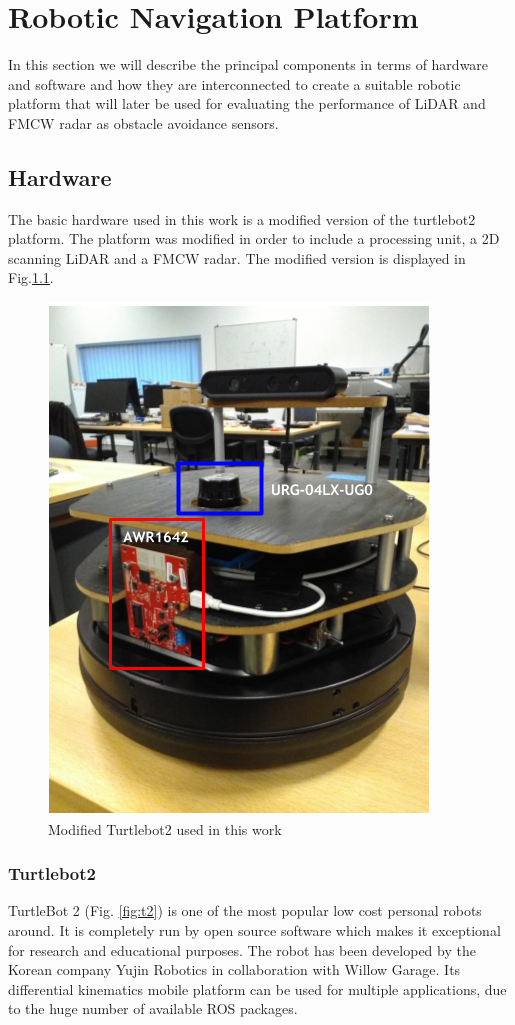 \chapter{Robotic Navigation Platform }

In this section we will describe the principal components in terms of hardware and software and how they are interconnected to create a suitable robotic platform that will later be used for evaluating the performance of \ac{LiDAR} and \ac{FMCW} \ac{radar} as obstacle avoidance sensors.


\section{Hardware}
The basic hardware used in this work is a  modified version of the  turtlebot2 platform.
The platform was modified in order to include a processing unit, a 2D scanning \ac{LiDAR} and a \ac{FMCW} radar. The modified version is displayed in Fig.\ref{fig::turlebot2M}. 

\begin{figure}[ht!] 
\centerline{\includegraphics [width=0.4 \textwidth]{imgs/chapter4/turtlebot2.PNG}}
\caption{Modified Turtlebot2 used in this work}
\label{fig::turlebot2M}
\end{figure}

\subsection{Turtlebot2}
TurtleBot 2 (Fig. \ref{fig:t2}) is one of the  most popular low cost personal robots around. It is completely run by open source software which makes it exceptional for research and educational purposes. The robot has been developed by the Korean company Yujin Robotics in collaboration with Willow Garage. Its differential kinematics mobile platform can be used for multiple applications, due to the huge number of available ROS packages. 

